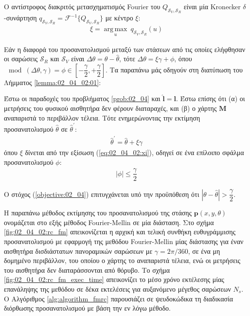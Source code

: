 Ο αντίστροφος διακριτός μετασχηματισμός Fourier του
$Q_{\mathcal{S}_V, \mathcal{S}_R}$ είναι μία Kronecker $\delta$-συνάρτηση
$q_{\mathcal{S}_V, \mathcal{S}_R} = \mathcal{F}^{-1}\{Q_{\mathcal{S}_V, \mathcal{S}_R}\}$
με κέντρο $\xi$:
\begin{align}
  \xi = \operatorname*{arg\,max}\limits_u \ q_{\mathcal{S}_V, \mathcal{S}_R}(u)
  \label{eq:02_04_02:xi}
\end{align}

Εάν η διαφορά του προσανατολισμού μεταξύ των στάσεων από τις οποίες ελήφθησαν
οι σαρώσεις $\mathcal{S}_R$ και $\mathcal{S}_V$ είναι
$\Delta\theta = \theta - \hat{\theta}$, τότε
$\Delta\theta = \xi\gamma + \phi$, όπου
$\mod(\Delta\theta, \gamma) = \phi \in [-\dfrac{\gamma}{2},+\dfrac{\gamma}{2}]$.
Τα παραπάνω μάς οδηγούν στη διατύπωση του Λήμματος \ref{lemma:02_04_02:01}:

\begin{lemma}
  Έστω οι παραδοχές του προβλήματος \ref{prob:02_04} και $\hat{\bm{l}} = \bm{l}$.
  Έστω επίσης ότι (α) οι μετρήσεις του φυσικού αισθητήρα δεν φέρουν
  διαταραχές, και (β) ο χάρτης $\bm{M}$ αναπαριστά το περιβάλλον τέλεια.
  Τότε ενημερώνοντας την εκτίμηση προσανατολισμού $\hat{\theta}$ σε
  $\hat{\theta}^\prime$:
  \begin{align}
    \hat{\theta}^\prime = \hat{\theta} + \xi \gamma \label{eq:update_t1}
  \end{align}
  όπου $\xi$ δίνεται από την εξίσωση (\ref{eq:02_04_02:xi}),
  οδηγεί σε ένα επίλοιπο σφάλμα προσανατολισμού $\phi$:
  \begin{align}
    |\phi| \leq \dfrac{\gamma}{2}  \label{eq:phi_1}
  \end{align}
  \label{lemma:02_04_02:01}
\end{lemma}

\begin{corollary}
  Ο στόχος (\ref{objective:02_04}) επιτυγχάνεται υπό την προϋπόθεση ότι
  $|\theta-\hat{\theta}| > \dfrac{\gamma}{2}$.
\end{corollary}

Η παραπάνω μέθοδος εκτίμησης του προσανατολισμού της στάσης
$\bm{p}(x,y,\theta)$ ονομάζεται στο εξής μέθοδος Fourier-Mellin σε μία
διάσταση. Στο σχήμα \ref{fig:02_04_02:rc_fm} απεικονίζεται η αρχική και τελική
συνθήκη ευθυγράμμισης προσανατολισμού με εφαρμογή της μεθόδου Fourier-Mellin
μίας διάστασης για έναν αισθητήρα δισδιάστατων πανοραμικών σαρώσεων με $\gamma
= 2\pi/360$, σε ένα μη δομημένο περιβάλλον, του οποίου ο χάρτης το αναπαριστά
τέλεια, ενώ οι μετρήσεις του αισθητήρα δεν διαταράσσονται από θόρυβο. Το σχήμα
\ref{fig:02_04_02:rc_fm_exec_time} απεικονίζει το μέσο χρόνο εκτέλεσης μίας
επανάληψης της μεθόδου σε δέκα εκτελέσεις για αυξανόμενο μέγεθος σαρώσεων $N_s$.
Ο Αλγόριθμος \ref{alg:algorithm_fmrc} παρουσιάζει σε ψευδοκώδικα τη διαδικασία
διόρθωσης προσανατολισμού με βάση την εν λόγω μέθοδο.

